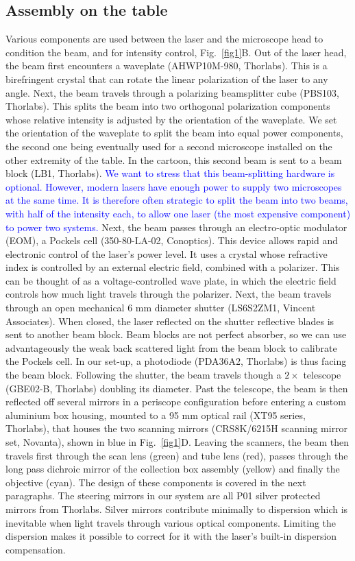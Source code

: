 \documentclass[10pt,letterpaper]{article}
\begin{document}
\subsection*{Assembly on the table}
Various components are used between the laser and the microscope head to condition the beam, and  for intensity control, Fig.~\ref{fig1}B. Out of the laser head, the beam first encounters a waveplate (AHWP10M-980, Thorlabs). This is a birefringent crystal that can rotate the linear polarization of the laser to any angle. Next, the beam travels through a polarizing beamsplitter cube (PBS103, Thorlabs). This splits the beam into two orthogonal polarization components whose relative intensity is adjusted by the orientation of the waveplate. We set the orientation of the waveplate to split the beam into equal power components, the second one being eventually used for a second microscope installed on the other extremity of the table. In the cartoon, this second beam is sent to a beam block (LB1, Thorlabs). \textcolor{blue}{We want to stress that this beam-splitting hardware is optional. However, modern lasers have enough power to supply two microscopes at the same time. It is therefore often strategic to split the beam into two beams, with half of the intensity each, to allow one laser (the most expensive component) to power two systems.} Next, the beam passes through an electro-optic modulator (EOM), a Pockels cell (350-80-LA-02, Conoptics). This device allows rapid and electronic control of the laser's power level. It uses a crystal whose refractive index is controlled by an external electric field, combined with a polarizer. This can be thought of as a voltage-controlled wave plate, in which the electric field controls how much light travels through the polarizer. Next, the beam travels through an open mechanical 6 mm diameter shutter (LS6S2ZM1, Vincent Associates). When closed, the laser reflected on the shutter reflective blades is sent to another beam block. Beam blocks are not perfect absorber, so we can use advantageously the weak back scattered light from the beam block to calibrate the Pockels cell. In our set-up, a photodiode (PDA36A2, Thorlabs) is thus facing the beam block. Following the shutter, the beam travels though a $2\times$ telescope (GBE02-B, Thorlabs) doubling its diameter. Past the telescope, the beam is then reflected off several mirrors in a periscope configuration before entering a custom aluminium box housing, mounted to a 95 mm optical rail (XT95 series, Thorlabs), that houses the two scanning mirrors (CRS8K/6215H scanning mirror set, Novanta), shown in blue in Fig.~\ref{fig1}D. Leaving the scanners, the beam then travels first through the scan lens (green) and tube lens (red), passes through the long pass dichroic mirror of the collection box assembly (yellow) and finally the objective (cyan). The design of these components is covered in the next paragraphs. The steering mirrors in our system are all P01 silver protected mirrors from Thorlabs. Silver mirrors contribute minimally to dispersion which is inevitable when light travels through various optical components. Limiting the dispersion makes it possible to correct for it with the laser's built-in dispersion compensation. 
\end{document}
